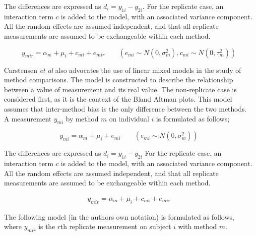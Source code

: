 \documentclass{report}
\begin{document}
	
	
	
	
	The differences are expressed as $d_{i} = y_{1i} - y_{2i}$.
	For the
	replicate case, an interaction term $c$ is added to the model,
	with an associated variance component. 
	All the random effects are
	assumed independent, and that all replicate measurements are
	assumed to be exchangeable within each method.
	
	
	
	\begin{equation}
	y_{mir}  = \alpha_{m} + \mu_{i} + c_{mi} + e_{mir} \qquad ( e_{mi}
	\sim N(0,\sigma^{2}_{m}), c_{mi} \sim N(0,\tau^{2}_{m}))
	\end{equation}
	
	
	
	Carstensen \textit{et al} \cite{BXC2004} also advocates the use of linear mixed models in
	the study of method comparisons. 
	The model is constructed to
	describe the relationship between a value of measurement and its
	real value.
	The non-replicate case is considered first, as it is
	the context of the Bland Altman plots. This model assumes that
	inter-method bias is the only difference between the two methods.
	A measurement $y_{mi}$ by method $m$ on individual $i$ is
	formulated as follows;
	
	\begin{equation}
	y_{mi}  = \alpha_{m} + \mu_{i} + e_{mi} \qquad ( e_{mi} \sim
	N(0,\sigma^{2}_{m}))
	\end{equation}
	
	
	
	
	The differences are expressed as $d_{i} = y_{1i} - y_{2i}$ For the
	replicate case, an interaction term $c$ is added to the model,
	with an associated variance component. 
	All the random effects are
	assumed independent, and that all replicate measurements are
	assumed to be exchangeable within each method.
	
	\begin{eqnarray}
	y_{mir}  = \alpha_{m} + \mu_{i} + c_{mi} + e_{mir} 
	\end{eqnarray}
	
	
	
	The following model (in the authors own notation) is
	formulated as follows, where $y_{mir}$ is the $r$th replicate
	measurement on subject $i$ with method $m$.
	
\end{document}
